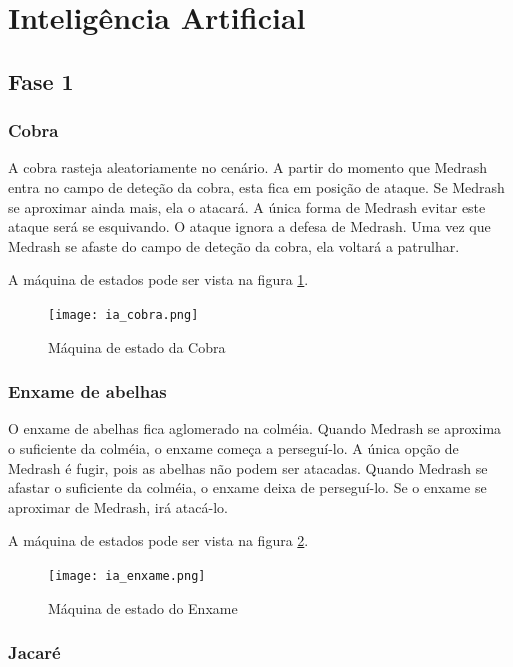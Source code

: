 \section{Inteligência Artificial}

\subsection{Fase 1}

\subsubsection{Cobra}

A cobra rasteja aleatoriamente no cenário. A partir do momento que
Medrash entra no campo de deteção da cobra, esta fica em posição
de ataque. Se Medrash se aproximar ainda mais, ela o atacará.
A única forma de Medrash evitar este ataque será se esquivando. O ataque
ignora a defesa de Medrash.
Uma vez que Medrash se afaste do campo de deteção da cobra, ela
voltará a patrulhar.

A máquina de estados pode ser vista na figura \ref{fsm:cobra}.

\begin{figure}[!ht]
 \centering
 \texttt{[image: ia\_cobra.png]}
 \caption{Máquina de estado da Cobra}
 \label{fsm:cobra}
\end{figure}

\subsubsection{Enxame de abelhas}

O enxame de abelhas fica aglomerado na colméia. Quando Medrash se
aproxima o suficiente da colméia, o enxame começa a perseguí-lo.
A única opção de Medrash é fugir, pois as abelhas não podem ser atacadas.
Quando Medrash se afastar o suficiente da colméia, o enxame deixa
de perseguí-lo.
Se o enxame se aproximar de Medrash, irá atacá-lo.

A máquina de estados pode ser vista na figura \ref{fsm:enxame}.

\begin{figure}[!ht]
 \centering
 \texttt{[image: ia\_enxame.png]}
 \caption{Máquina de estado do Enxame}
 \label{fsm:enxame}
\end{figure}

\subsubsection{Jacaré}

